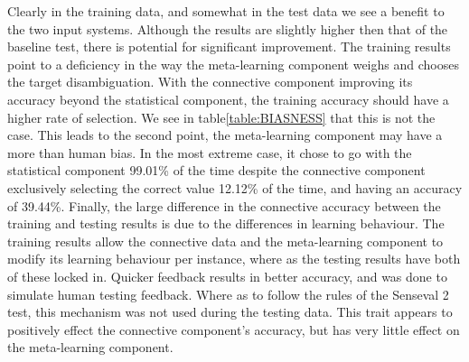 Clearly in the training data, and somewhat in the test data we see a benefit to
the two input systems. Although the results are slightly higher then that of the
baseline test, there is potential for significant improvement.  The training
results point to a deficiency in the way the meta-learning component weighs and
chooses the target disambiguation.  With the connective component improving its
accuracy beyond the statistical component, the training accuracy should have a
higher rate of selection. We see in table\ref{table:BIASNESS} that this is not
the case. This leads to the second point, the meta-learning component may have a
more than human bias.  In the most extreme case, it chose to go with the
statistical component 99.01\% of the time despite the connective component
exclusively selecting the correct value 12.12\% of the time, and having an
accuracy of 39.44\%. Finally, the large difference in the connective accuracy
between the training and testing results is due to the differences in learning
behaviour.  The training results allow the connective data and the meta-learning
component to modify its learning behaviour per instance, where as the testing
results have both of these locked in.  Quicker feedback results in better
accuracy, and was done to simulate human testing feedback. Where as to follow
the rules of the Senseval 2 test, this mechanism was not used during the testing
data.  This trait appears to positively effect the connective component's
accuracy, but has very little effect on the meta-learning component.

